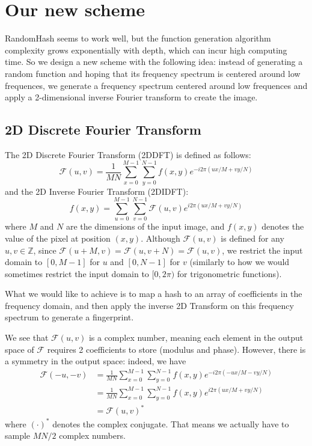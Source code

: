 \documentclass{article}
\begin{document}
\section{Our new scheme}
RandomHash seems to work well, but the function generation algorithm complexity grows exponentially with depth, which can incur high computing time. So we design a new scheme with the following idea: instead of generating a random function and hoping that its frequency spectrum is centered around low frequences, we generate a frequency spectrum centered around low frequences and apply a 2-dimensional inverse Fourier transform to create the image.
\subsection{2D Discrete Fourier Transform}
The 2D Discrete Fourier Transform (2DDFT) is defined as follows:
$$\mathcal{F}(u,v) = \frac{1}{MN}\sum\limits_{x=0}^{M-1}\sum\limits_{y=0}^{N-1}f(x,y) e^{-i2\pi(ux/M + vy/N)}$$
and the 2D Inverse Fourier Transform (2DIDFT):
$$f(x,y) = \sum\limits_{u=0}^{M-1}\sum\limits_{v=0}^{N-1}\mathcal F(u,v) e^{i2\pi(ux/M + vy/N)}$$
where $M$ and $N$ are the dimensions of the input image, and $f(x,y)$ denotes the value of the pixel at position $(x,y)$. Although $\mathcal{F}(u,v)$ is defined for any $u,v \in \mathbb Z$, since $\mathcal F(u + M, v) = \mathcal F(u, v + N) = \mathcal F(u,v)$, we restrict the input domain to $[0,M-1]$ for $u$ and $[0,N-1]$ for $v$ (similarly to how we would sometimes restrict the input domain to $[0, 2\pi)$ for trigonometric functions).

What we would like to achieve is to map a hash to an array of coefficients in the frequency domain, and then apply the inverse 2D Transform on this frequency spectrum to generate a fingerprint.

We see that $\mathcal{F}(u,v)$ is a complex number, meaning each element in the output space of $\mathcal F$ requires 2 coefficients to store (modulus and phase). However, there is a symmetry in the output space: indeed, we have 
\begin{align*}
    \mathcal{F}(-u,-v) &= \frac{1}{MN}\sum\limits_{x=0}^{M-1}\sum\limits_{y=0}^{N-1}f(x,y) e^{-i2\pi(-ux/M - vy/N)}\\
    &=  \frac{1}{MN}\sum\limits_{x=0}^{M-1}\sum\limits_{y=0}^{N-1}f(x,y) e^{i2\pi(ux/M + vy/N)}\\
    &= \mathcal{F}(u,v)^*
\end{align*}
where $(\cdot)^*$ denotes the complex conjugate. That means we actually have to sample $MN/2$ complex numbers.
\end{document}
